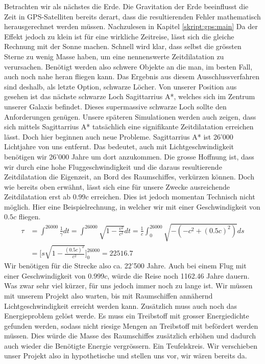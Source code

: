 \begin{refsection}
    Betrachten wir als nächstes die Erde. Die Gravitation der Erde beeinflusst die Zeit in GPS-Satelliten bereits derart, dass die resultierenden Fehler mathematisch herausgerechnet werden müssen. Nachzulesen in Kapitel \ref{skript:gps:main} %
    Da der Effekt jedoch zu klein ist für eine wirkliche Zeitreise, lässt sich die gleiche Rechnung mit der Sonne machen. Schnell wird klar, dass selbst die grössten Sterne zu wenig Masse haben, um eine nennenswerte Zeitdilatation zu verursachen. Benötigt werden also schwere Objekte an die man, im besten Fall, auch noch nahe heran fliegen kann. Das Ergebnis aus diesem Ausschlussverfahren sind deshalb, als letzte Option, schwarze Löcher. Von unserer Position aus gesehen ist das nächste schwarze Loch Sagittarrius A*, welches sich im Zentrum unserer Galaxis befindet. Dieses supermassive schwarze Loch sollte den Anforderungen genügen. Unsere späteren Simulationen werden auch zeigen, dass sich mittels Sagittarrius A*  tatsächlich eine signifikante Zeitdilatation erreichen lässt.
    Doch hier beginnen auch neue Probleme. Sagittarrius A* ist 26'000 Lichtjahre von uns entfernt. Das bedeutet, auch mit Lichtgeschwindigkeit benötigen wir 26'000 Jahre um dort anzukommen. Die grosse Hoffnung ist, dass wir durch eine hohe Fluggeschwindigkeit und die daraus resultierende Zeitdilatation die Eigenzeit, an Bord des Raumschiffes, verkürzen können. 
    Doch wie bereits oben erwähnt, lässt sich eine für unsere Zwecke ausreichende Zeitdilatation erst ab $0.99c$ erreichen. Dies ist jedoch momentan Technisch nicht möglich. 
    Hier eine Beispielrechnung, in welcher wir mit einer Geschwindigkeit von $0.5c$ fliegen.
	\begin{align*}
	\tau
	&= 
	\int_{}^{26000}\frac{1}{\gamma}dt=\int_{}^{26000}\sqrt{1-\frac{v^2}{c^2}}dt
	= 
	\frac{1}{c}\int_{0}^{26000}\sqrt{-(-c^2+(0.5c)^2)}ds\\
	&=
	\biggl[s\sqrt{1-\frac{(0.5c)^{2}}{c^2}}\biggr]_0^{26000}
	=
	22516.7
	\end{align*}
	Wir benötigen für die Strecke also ca. 22'500 Jahre.
	Auch bei einem Flug mit einer Geschwindigkeit von $0.999c$, würde die Reise noch 1162.46 Jahre dauern. Was zwar sehr viel kürzer, für uns jedoch immer noch zu lange ist.
	Wir müssen mit unserem Projekt also warten, bis mit Raumschiffen annähernd Lichtgeschwindigkeit erreicht werden kann. Zusätzlich muss auch noch das Energieproblem gelöst werde. Es muss ein Treibstoff mit grosser Energiedichte gefunden werden, sodass nicht riesige Mengen an Treibstoff mit befördert werden müssen. Dies würde die Masse des Raumschiffes zusätzlich erhöhen und dadurch auch wieder die Benötigte Energie vergrössern. Ein Teufelskreis.
	Wir verschieben unser Projekt also in hypothetische und stellen uns vor, wir wären bereits da.
	

\end{refsection}
